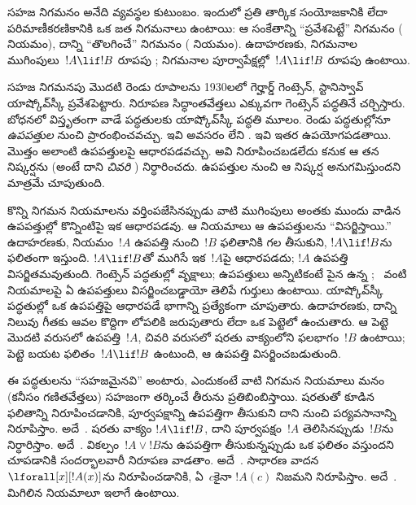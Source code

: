 \documentclass[../../../include/open-logic-section]{subfiles}
\begin{document}


సహజ నిగమనం అనేది  వ్యవస్థల కుటుంబం. ఇందులో ప్రతి తార్కిక సంయోజకానికి లేదా పరిమాణీకరణికానికి ఒక జత నిగమనాలు ఉంటాయి: ఆ సంకేతాన్ని ``ప్రవేశపెట్టే'' నిగమనం ( నియమం), దాన్ని ``తొలగించే'' నిగమనం ( నియమం). ఉదాహరణకు, \Intro{\lif} నిగమనాల ముగింపులు~$!A \lif !B$ రూపపు ; \Elim{\lif} నిగమనాల పూర్వాపేక్షల్లో~$!A \lif !B$ రూపపు  ఉంటాయి.

సహజ నిగమనపు మొదటి రెండు రూపాలను 1930లలో గెర్హార్డ్ గెంట్సెన్, స్టానిస్వావ్ యాష్కోవ్‌స్కీ ప్రవేశపెట్టారు. నిరూపణ సిద్ధాంతవేత్తలు ఎక్కువగా గెంట్సెన్ పద్ధతినే చర్చిస్తారు. బోధనలో విస్తృతంగా వాడే పద్ధతులకు యాష్కోవ్‌స్కీ పద్ధతి మూలం. రెండు పద్ధతుల్లోనూ \emph{ఉపపత్తుల} నుంచి ప్రారంభించవచ్చు. ఇవి  అవసరం లేని . ఇవి ఇతర   ఉపయోగపడతాయి. మొత్తం  అలాంటి ఉపపత్తులపై ఆధారపడవచ్చు. అవి నిరూపించబడలేదు కనుక ఆ  తన నిష్కర్షను (అంటే దాని \emph{చివరి }) నిర్ధారించదు. ఉపపత్తుల నుంచి ఆ నిష్కర్ష అనుగమిస్తుందని మాత్రమే చూపుతుంది.

కొన్ని నిగమన నియమాలను వర్తింపజేసినప్పుడు వాటి ముగింపులు అంతకు ముందు వాడిన ఉపపత్తుల్లో కొన్నింటిపై ఇక ఆధారపడవు. ఆ నియమాలు ఆ ఉపపత్తులను ``విసర్జిస్తాయి.'' ఉదాహరణకు, \Intro{\lif} నియమం~$!A$ ఉపపత్తి నుంచి~$!B$ ఫలితానికి గల  తీసుకుని, $!A \lif !B$ను ఫలితంగా ఇస్తుంది. $!A \lif !B$తో ముగిసే  ఇక~$!A$పై ఆధారపడదు; $!A$ ఉపపత్తి విసర్జితమవుతుంది. గెంట్సెన్ పద్ధతుల్లో   వృక్షాలు; ఉపపత్తులు అన్నిటికంటే పైన ఉన్న ;~\Intro{\lif} వంటి నియమాలపై ఏ ఉపపత్తులు విసర్జించబడ్డాయో తెలిపే గుర్తులు ఉంటాయి. యాష్కోవ్‌స్కీ పద్ధతుల్లో ఒక ఉపపత్తిపై ఆధారపడే  భాగాన్ని ప్రత్యేకంగా చూపుతారు. ఉదాహరణకు, దాన్ని నిలువు గీతకు ఆవల కొద్దిగా లోపలికి జరుపుతారు లేదా ఒక పెట్టెలో ఉంచుతారు. ఆ పెట్టె మొదటి వరుసలో ఉపపత్తి~$!A$, చివరి వరుసలో షరతు వాక్యంలోని ఫలభాగం~$!B$ ఉంటాయి; పెట్టె బయట \Intro{\lif} ఫలితం~$!A \lif !B$ ఉంటుంది, ఆ ఉపపత్తి విసర్జించబడుతుంది.

ఈ పద్ధతులను ``సహజమైనవి'' అంటారు, ఎందుకంటే వాటి నిగమన నియమాలు మనం (కనీసం గణితవేత్తలు) సహజంగా తర్కించే తీరును ప్రతిబింబిస్తాయి. షరతుతో కూడిన ఫలితాన్ని నిరూపించడానికి, పూర్వపక్షాన్ని ఉపపత్తిగా తీసుకుని దాని నుంచి పర్యవసానాన్ని నిరూపిస్తాం. అదే~\Intro{\lif}. షరతు వాక్యం $!A \lif !B$, దాని పూర్వపక్షం~$!A$ తెలిసినప్పుడు~$!B$ను నిర్ధారిస్తాం. అదే~\Elim{\lif}. వికల్పం~$!A \lor !B$ను ఉపపత్తిగా తీసుకున్నప్పుడు ఒక ఫలితం వస్తుందని చూపడానికి సందర్భాలవారీ నిరూపణ వాడతాం. అదే~\Elim{\lor}. సాధారణ వాదన~$\lforall[x][!A(x)]$ను నిరూపించడానికి, ఏ~$c$కైనా $!A(c)$ నిజమని నిరూపిస్తాం. అదే~\Intro{\lforall}. మిగిలిన నియమాలూ ఇలాగే ఉంటాయి.
\end{document}
